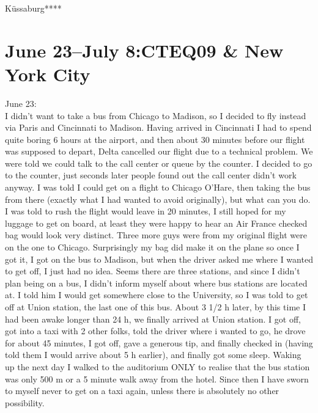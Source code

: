 K\"ussaburg****

\section{June 23--July 8:CTEQ09 \& New York City}
\label{2009:US}

June 23:\\
I didn't want to take a bus from Chicago to Madison, so I decided to fly instead via Paris and Cincinnati to Madison. Having arrived in Cincinnati I had to spend quite boring 6 hours at the airport, and then about 30 minutes before our flight was supposed to depart, Delta cancelled our flight due to a technical problem. We were told we could talk to the call center or queue by the counter. I decided to go to the counter, just seconds later people found out the call center didn't work anyway. I was told I could get on a flight to Chicago O'Hare, then taking the bus from there (exactly what I had wanted to avoid originally), but what can you do. I was told to rush the flight would leave in 20 minutes, I still hoped for my luggage to get on board, at least they were happy to hear an Air France checked bag would look very distinct. Three more guys were from my original flight were on the one to Chicago. Surprisingly my bag did make it on the plane so once I got it, I got on the bus to Madison, but when the driver asked me where I wanted to get off, I just had no idea. Seems there are three stations, and since I didn't plan being on a bus, I didn't inform myself about where bus stations are located at. I told him I would get somewhere close to the University, so I was told to get off at Union station, the last one of this bus. About 3 1/2 h later, by this time I had been awake longer than 24 h, we finally arrived at Union station. I got off, got into a taxi with 2 other folks, told the driver where i wanted to go, he drove for about 45 minutes, I got off, gave a generous tip, and finally checked in (having told them I would arrive about 5 h earlier), and finally got some sleep. Waking up the next day I walked to the auditorium ONLY to realise that the bus station was only 500 m or a 5 minute walk away from the hotel. Since then I have sworn to myself never to get on a taxi again, unless there is absolutely no other possibility.\\

